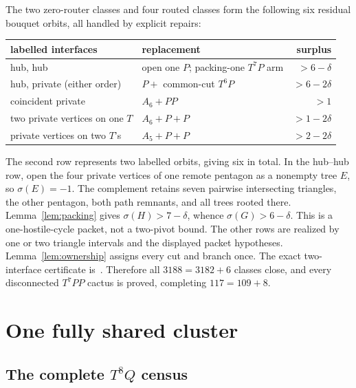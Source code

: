 \documentclass[11pt]{article}
\newcommand{\sig}{\sigma}
\begin{document}
The two zero-router classes and four routed classes form the following six
residual bouquet orbits, all handled by explicit repairs:
\begin{center}
\begin{tabular}{llr}
\toprule
labelled interfaces&replacement&surplus\\
\midrule
hub, hub&open one $P$; packing-one $T^7P$ arm&$>6-\delta$\\
hub, private (either order)&$P+$ common-cut $T^6P$&$>6-2\delta$\\
coincident private&$A_6+PP$&$>1$\\
two private vertices on one $T$&$A_6+P+P$&$>1-2\delta$\\
private vertices on two $T$'s&$A_5+P+P$&$>2-2\delta$\\
\bottomrule
\end{tabular}
\end{center}
The second row represents two labelled orbits, giving six in total.  In the
hub--hub row, open the four private vertices of one remote pentagon as a
nonempty tree $E$, so $\sig(E)=-1$.  The complement retains seven pairwise
intersecting triangles, the other pentagon, both path remnants, and all trees
rooted there.  Lemma~\ref{lem:packing} gives $\sig(H)>7-\delta$, whence
$\sig(G)>6-\delta$.  This is a one-hostile-cycle packet, not a two-pivot bound.
The other rows are realized by one or two triangle intervals and the displayed
packet hypotheses.  Lemma~\ref{lem:ownership} assigns every cut and branch
once.  The exact two-interface certificate is~\cite{TwoInterface}.  Therefore
all $3188=3182+6$ classes close, and every disconnected $T^7PP$ cactus is
proved, completing $117=109+8$.

\section{One fully shared cluster}

\subsection{The complete \texorpdfstring{$T^8Q$}{T8Q} census}
\end{document}
